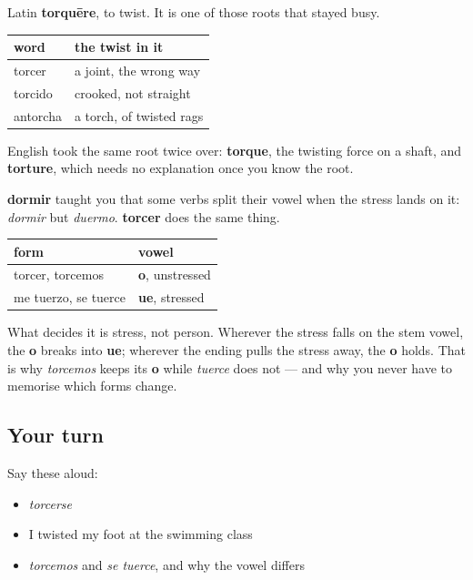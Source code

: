 \begin{cousinweb}
Latin \textbf{torquēre}, to twist. It is one of those roots that stayed busy.

\noindent
\begin{tabularx}{\linewidth}{@{}>{\raggedright\arraybackslash}X>{\raggedright\arraybackslash}X@{}}
\toprule
\textbf{word} & \textbf{the twist in it} \\
\midrule
torcer & a joint, the wrong way \\
torcido & crooked, not straight \\
antorcha & a torch, of twisted rags \\
\bottomrule
\end{tabularx}

English took the same root twice over: \textbf{torque}, the twisting force on a shaft, and \textbf{torture}, which needs no explanation once you know the root.
\end{cousinweb}

\begin{grammarlens}[title={Grammar Lens: the stem that breaks}]
\textbf{dormir} taught you that some verbs split their vowel when the stress lands on it: \emph{dormir} but \emph{duermo}. \textbf{torcer} does the same thing.

\noindent
\begin{tabularx}{\linewidth}{@{}>{\raggedright\arraybackslash}X>{\raggedright\arraybackslash}X@{}}
\toprule
\textbf{form} & \textbf{vowel} \\
\midrule
torcer, torcemos & \textbf{o}, unstressed \\
me tuerzo, se tuerce & \textbf{ue}, stressed \\
\bottomrule
\end{tabularx}

What decides it is stress, not person. Wherever the stress falls on the stem vowel, the \textbf{o} breaks into \textbf{ue}; wherever the ending pulls the stress away, the \textbf{o} holds. That is why \emph{torcemos} keeps its \textbf{o} while \emph{tuerce} does not — and why you never have to memorise which forms change.
\end{grammarlens}

\subsection*{Your turn}
Say these aloud:

\begin{itemize}
\raggedright
  \item \emph{torcerse}
  \item I twisted my foot at the swimming class
  \item \emph{torcemos} and \emph{se tuerce}, and why the vowel differs
\end{itemize}


